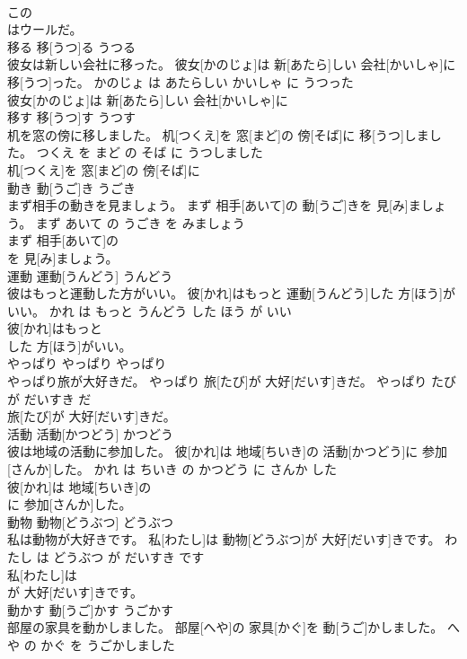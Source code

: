 \documentclass[8pt]{extreport}
\begin{document}
\begin{CJK}{UTF8}{min}
\\	この
\\	はウールだ。			
\\	移る	移[うつ]る	うつる	
\\	彼女は新しい会社に移った。	彼女[かのじょ]は 新[あたら]しい 会社[かいしゃ]に 移[うつ]った。	かのじょ は あたらしい かいしゃ に うつった	
\\	彼女[かのじょ]は 新[あたら]しい 会社[かいしゃ]に
\\	移す	移[うつ]す	うつす	
\\	机を窓の傍に移しました。	机[つくえ]を 窓[まど]の 傍[そば]に 移[うつ]しました。	つくえ を まど の そば に うつしました	
\\	机[つくえ]を 窓[まど]の 傍[そば]に
\\	動き	動[うご]き	うごき	
\\	まず相手の動きを見ましょう。	まず 相手[あいて]の 動[うご]きを 見[み]ましょう。	まず あいて の うごき を みましょう	
\\	まず 相手[あいて]の
\\	を 見[み]ましょう。			
\\	運動	運動[うんどう]	うんどう	
\\	彼はもっと運動した方がいい。	彼[かれ]はもっと 運動[うんどう]した 方[ほう]がいい。	かれ は もっと うんどう した ほう が いい	
\\	彼[かれ]はもっと
\\	した 方[ほう]がいい。			
\\	やっぱり	やっぱり	やっぱり	
\\	やっぱり旅が大好きだ。	やっぱり 旅[たび]が 大好[だいす]きだ。	やっぱり たび が だいすき だ	
\\	旅[たび]が 大好[だいす]きだ。			
\\	活動	活動[かつどう]	かつどう	
\\	彼は地域の活動に参加した。	彼[かれ]は 地域[ちいき]の 活動[かつどう]に 参加[さんか]した。	かれ は ちいき の かつどう に さんか した	
\\	彼[かれ]は 地域[ちいき]の
\\	に 参加[さんか]した。			
\\	動物	動物[どうぶつ]	どうぶつ	
\\	私は動物が大好きです。	私[わたし]は 動物[どうぶつ]が 大好[だいす]きです。	わたし は どうぶつ が だいすき です	
\\	私[わたし]は
\\	が 大好[だいす]きです。			
\\	動かす	動[うご]かす	うごかす	
\\	部屋の家具を動かしました。	部屋[へや]の 家具[かぐ]を 動[うご]かしました。	へや の かぐ を うごかしました	

\end{CJK}
\end{document}
